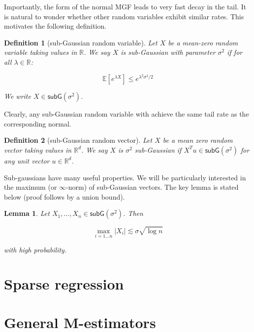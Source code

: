\documentclass{article}
\newcommand{\R}{\mathbb{R}}
\newcommand{\ev}[1]{\mathbb{E}\left[#1\right]}
\newcommand{\subG}{\mathsf{subG}}
\newtheorem{lemma}{Lemma}
\newtheorem{definition}{Definition}
\begin{document}
Importantly, the form of the normal MGF leads to
very fast decay in the tail. It is natural to wonder whether other random
variables exhibit similar rates. This motivates the
following definition.

\begin{definition} [sub-Gaussian random variable]
	Let $X$ be a mean-zero random variable taking values in $\R$. We say $X$ is sub-Gaussian with
	parameter $\sigma^2$ if for all $\lambda \in \R$:

	$$\ev{e^{\lambda X}} \leq e^{\lambda^2\sigma^2 / 2}$$

	We write $X \in \subG(\sigma^2)$.
\end{definition} 

Clearly, any sub-Gaussian random variable with achieve the same tail rate as the
corresponding normal.

\begin{definition}[sub-Gaussian random vector]
	Let $X$ be a mean zero random vector taking values in $\R^d$. We say $X$
	is $\sigma^2$ sub-Gaussian  if $X^Tu \in \subG(\sigma^2)$ for any unit
	vector $u \in \R^d$.
\end{definition}

Sub-gaussians have many useful properties. We will be particularly interested in the maximum (or $\infty$-norm) of
sub-Gaussian vectors. The key lemma is stated below (proof follows by a union bound).

\begin{lemma}
	Let $X_1, ..., X_n \in \subG(\sigma^2)$. Then

	$$\max_{i = 1...n}|X_i| \lesssim \sigma\sqrt{\log n}$$

	with high probability.
\end{lemma}

\section{Sparse regression}

\section{General M-estimators}
\end{document}
